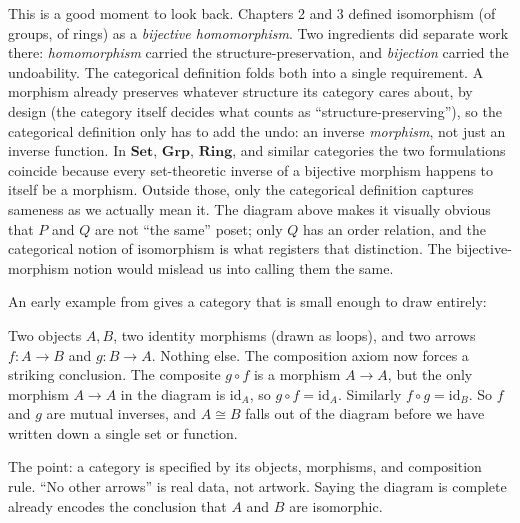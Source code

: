 \begin{example}
This is a good moment to look back. Chapters 2 and 3 defined isomorphism (of
groups, of rings) as a \textit{bijective homomorphism}. Two ingredients did
separate work there: \textit{homomorphism} carried the structure-preservation,
and \textit{bijection} carried the undoability. The categorical definition
folds both into a single requirement. A morphism already preserves whatever
structure its category cares about, by design (the category itself decides
what counts as ``structure-preserving''), so the categorical definition only
has to add the undo: an inverse \textit{morphism}, not just an inverse function.
In $\mathbf{Set}$, $\mathbf{Grp}$, $\mathbf{Ring}$, and similar categories the
two formulations coincide because every set-theoretic inverse of a bijective
morphism happens to itself be a morphism. Outside those, only the categorical
definition captures sameness as we actually mean it. The diagram above makes it
visually obvious that $P$ and $Q$ are not ``the same'' poset; only $Q$ has an
order relation, and the categorical notion of isomorphism is what registers that
distinction. The bijective-morphism notion would mislead us into calling them
the same.
\end{example}

\begin{example}\label{ex:magurn-two-object}
An early example from \cite{magurn2002algebraic} gives a category that is small
enough to draw entirely:
\begin{center}
\end{center}
Two objects $A, B$, two identity morphisms (drawn as loops), and two arrows
$f : A \to B$ and $g : B \to A$. Nothing else. The composition axiom now forces
a striking conclusion. The composite $g \circ f$ is a morphism $A \to A$, but
the only morphism $A \to A$ in the diagram is $\mathrm{id}_A$, so
$g \circ f = \mathrm{id}_A$. Similarly $f \circ g = \mathrm{id}_B$. So $f$ and
$g$ are mutual inverses, and $A \cong B$ falls out of the diagram before we have
written down a single set or function.

The point: a category is specified by its objects, morphisms, and composition
rule. ``No other arrows'' is real data, not artwork. Saying the diagram is
complete already encodes the conclusion that $A$ and $B$ are isomorphic.
\end{example}

